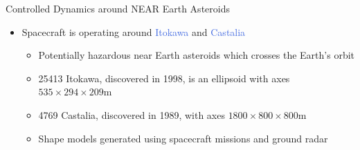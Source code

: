 \documentclass[final, usenames, dvipsnames]{beamer}
\newlength{\twocolwidth}
\newlength{\columnheight}
\def\Emph{\textcolor{RoyalBlue}}
\begin{document}
\begin{frame}[t]
\begin{columns}[T,onlytextwidth]
\begin{column}{\twocolwidth}
\begin{block}{Controlled Dynamics around NEAR Earth Asteroids}
\begin{minipage}{0.5\columnwidth}
\begin{itemize}
	\end{itemize}
	\end{minipage}%
	\begin{minipage}{0.5\columnwidth}%
        \begin{itemize}
            \item Spacecraft is operating around \Emph{Itokawa} and \Emph{Castalia}
            \begin{itemize}
                \item Potentially hazardous near Earth asteroids which crosses the Earth's orbit
                \item 25413 Itokawa, discovered in 1998, is an ellipsoid with axes \( 535 \times 294 \times 209 \si{\meter}\)
                \item 4769 Castalia, discovered in 1989, with axes \( 1800 \times 800 \times 800 \si{\meter}\) 
                \item Shape models generated using spacecraft missions and ground radar
            \end{itemize}
        \end{itemize}
        \begin{figure}
            \centering
            ~
        \end{figure}
	\end{minipage}%
\vspace{1.3cm}
\end{block} %


\end{column}
\end{columns}
\end{frame}
\end{document}
